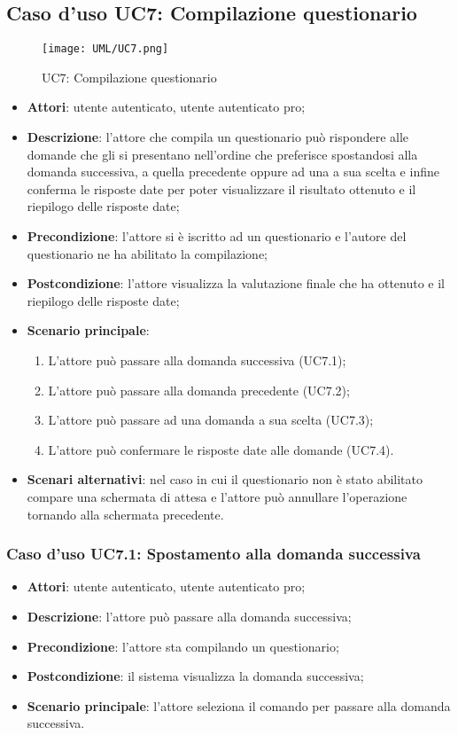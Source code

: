 \newpage
\subsection{Caso d'uso UC7: Compilazione questionario}
\label{UC7}
\begin{figure}[h]
\centering
\texttt{[image: UML/UC7.png]}
\caption{UC7: Compilazione questionario}
\end{figure}
\FloatBarrier
\begin{itemize}
\item\textbf{Attori}: utente autenticato, utente autenticato pro;
\item\textbf{Descrizione}: l'attore che compila un questionario può rispondere alle domande che gli si presentano nell'ordine che preferisce spostandosi alla domanda successiva, a quella precedente oppure ad una a sua scelta e infine conferma le risposte date per poter visualizzare il risultato ottenuto e il riepilogo delle risposte date;
\item\textbf{Precondizione}: l'attore si è iscritto ad un questionario e l'autore del questionario ne ha abilitato la compilazione;
\item\textbf{Postcondizione}: l'attore visualizza la valutazione finale che ha ottenuto e il riepilogo delle risposte date;
\item\textbf{Scenario principale}:
\begin{enumerate}
\item L'attore può passare alla domanda successiva (UC7.1);
\item L'attore può passare alla domanda precedente (UC7.2);
\item L'attore può passare ad una domanda a sua scelta (UC7.3);
\item L'attore può confermare le risposte date alle domande (UC7.4).
\end{enumerate}
\item\textbf{Scenari alternativi}: nel caso in cui il questionario non è stato abilitato compare una schermata di attesa e l'attore può annullare l'operazione tornando alla schermata precedente.
\end{itemize}

\subsubsection{Caso d'uso UC7.1: Spostamento alla domanda successiva}
\label{UC7.1}
\begin{itemize}
\item\textbf{Attori}: utente autenticato, utente autenticato pro;
\item\textbf{Descrizione}: l'attore può passare alla domanda successiva;
\item\textbf{Precondizione}: l'attore sta compilando un questionario;
\item\textbf{Postcondizione}: il sistema visualizza la domanda successiva;
\item\textbf{Scenario principale}: l'attore seleziona il comando per passare alla domanda successiva.
\end{itemize}

